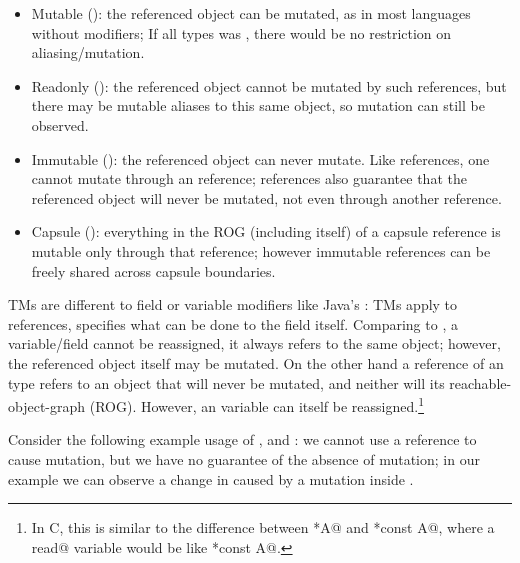 \begin{itemize}
\item Mutable (\Q@mut@): the referenced object can be mutated, as in most languages without modifiers; 
If all types was \Q@mut@, there would be no restriction on aliasing/mutation.
\item Readonly (\Q@read@): the referenced object cannot be mutated by such references, but there may be mutable aliases to this same object, so mutation can still be observed. 
\item Immutable (\Q@imm@): the referenced object can never mutate. Like \Q@read@ references, one cannot mutate through an \Q@imm@ reference; \Q@imm@ references also guarantee that the referenced object will never be mutated, not even through another reference.
\item Capsule (\Q@capsule@):
 everything in the ROG (including itself) of a capsule reference is mutable only through that reference; however immutable references can be freely shared across capsule boundaries.
\end{itemize}
TMs are different to field or variable modifiers like Java’s \Q@final@: TMs apply to references,  \Q@final@ specifies what can be done to the field itself. Comparing to \Q@imm@,
a \Q@final@ variable/field cannot be reassigned, it always refers to the same object; however, the referenced object itself may be mutated.
On the other hand a reference of an \Q@imm@ type refers to an object that will never be mutated, and neither will its reachable-object-graph (ROG). However, an \Q@imm@ variable can itself be reassigned.\footnote{In C, this is similar to the difference between \Q@const *A@ and \Q@*const A@, where a \Q@final read@ variable would be like \Q@const *const A@.}



\noindent Consider the following  example usage of \Q@mut@, \Q@imm@ and \Q@read@:
we cannot use a \Q@read@ reference to cause mutation, but we have no guarantee of the absence of mutation; in our example we can observe a change in \Q@rp@ caused by a mutation inside \Q@mp@.

